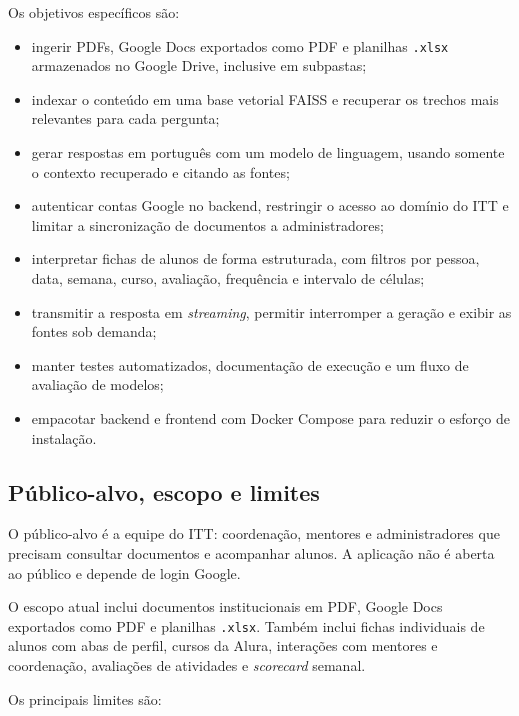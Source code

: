 \documentclass[12pt,a4paper]{article}
\begin{document}
Os objetivos específicos são:

\begin{itemize}
  \item ingerir PDFs, Google Docs exportados como PDF e planilhas \texttt{.xlsx}
        armazenados no Google Drive, inclusive em subpastas;
  \item indexar o conteúdo em uma base vetorial FAISS e recuperar os trechos mais
        relevantes para cada pergunta;
  \item gerar respostas em português com um modelo de linguagem, usando somente o
        contexto recuperado e citando as fontes;
  \item autenticar contas Google no backend, restringir o acesso ao domínio do ITT
        e limitar a sincronização de documentos a administradores;
  \item interpretar fichas de alunos de forma estruturada, com filtros por pessoa,
        data, semana, curso, avaliação, frequência e intervalo de células;
  \item transmitir a resposta em \emph{streaming}, permitir interromper a geração e
        exibir as fontes sob demanda;
  \item manter testes automatizados, documentação de execução e um fluxo de
        avaliação de modelos;
  \item empacotar backend e frontend com Docker Compose para reduzir o esforço de
        instalação.
\end{itemize}

\subsection{Público-alvo, escopo e limites}

O público-alvo é a equipe do ITT: coordenação, mentores e administradores que
precisam consultar documentos e acompanhar alunos. A aplicação não é aberta ao
público e depende de login Google.

O escopo atual inclui documentos institucionais em PDF, Google Docs exportados como
PDF e planilhas \texttt{.xlsx}. Também inclui fichas individuais de alunos com abas
de perfil, cursos da Alura, interações com mentores e coordenação, avaliações de
atividades e \emph{scorecard} semanal.

Os principais limites são:
\end{document}
